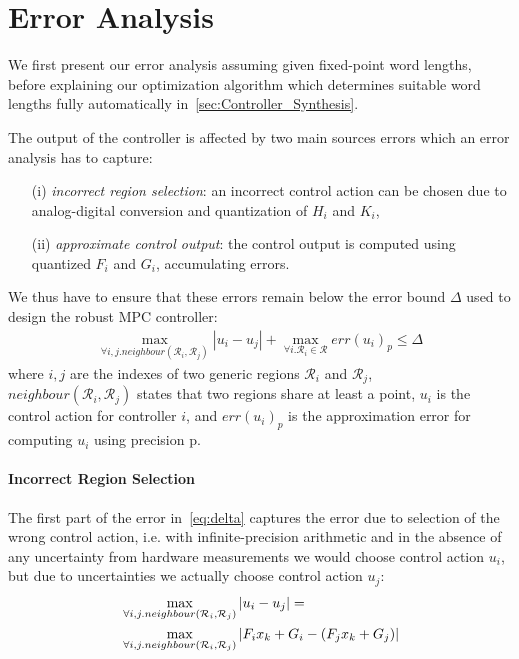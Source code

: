 \section{Error Analysis}
\label{sec:Error_Analysis}

We first present our error analysis assuming given fixed-point word lengths,
before explaining our optimization algorithm which determines suitable word
lengths fully automatically in~\autoref{sec:Controller_Synthesis}.

The output of the controller is affected by two main sources errors which an error
analysis has to capture: 
\begin{itemize}
  \item[(i)] \emph{incorrect region selection}: an incorrect control action can be chosen
    due to analog-digital conversion and quantization of $H_i$ and $K_i$,

  \item[(ii)] \emph{approximate control output}: the control output is computed
    using quantized $F_i$ and $G_i$, accumulating errors.
\end{itemize}

We thus have to ensure that these errors remain below the error bound $\Delta$
used to design the robust MPC controller:
\begin{align}\label{eq:delta}
  \max_{\forall i,j. neighbour(\mathcal{R}_{i},\mathcal{R}_{j})}|u_{i}-u_{j}| + \max_{\forall i.\mathcal{R}_{i}\in\mathcal{R}} err(u_{i})_{p} \le \Delta
\end{align}
where $i,j$ are the indexes of two generic regions $\mathcal{R}_{i}$ and
$\mathcal{R}_{j}$, \\ $neighbour(\mathcal{R}_{i},\mathcal{R}_{j})$ states that
two regions share at least a point, $u_{i}$ is the
control action for controller $i$, and $err(u_{i})_{p}$ is
the approximation error for computing $u_{i}$ using precision p.

\paragraph{Incorrect Region Selection}

The first part of the error in~\autoref{eq:delta} captures the error due to
selection of the wrong control action, i.e. with infinite-precision arithmetic
and in the absence of any uncertainty from hardware measurements we would choose
control action $u_i$, but due to uncertainties we actually choose control action $u_j$:
\begin{align} \label{eq:maximization}
  &\max_{\forall i,j.neighbour(\mathcal{R}_{i},\mathcal{R}_{j})}|u_{i}-u_{j}|= \\
  &\max_{\forall i,j.neighbour(\mathcal{R}_{i},\mathcal{R}_{j})}|F_{i}x_{k}+G_{i} - (F_{j}x_{k}+G_{j})|\nonumber
\end{align}

